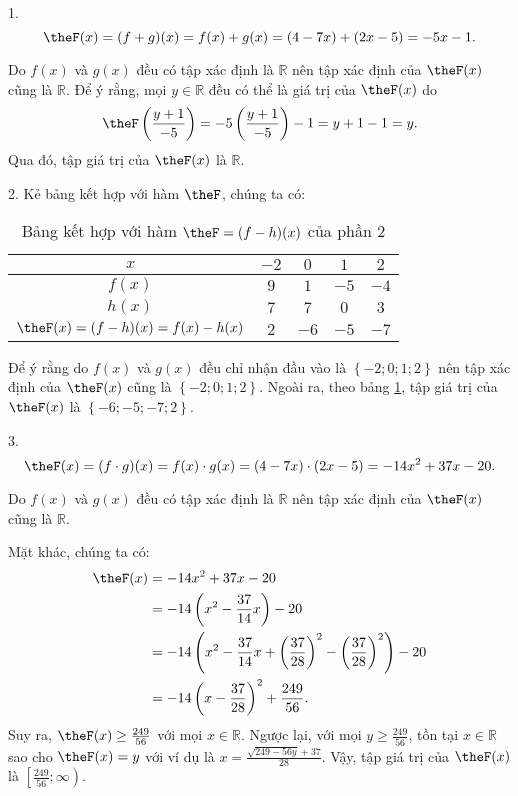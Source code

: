 \solution

1.
$$
\theF(x) = (f + g)(x) = f(x) + g(x) = (4 - 7x) + (2x - 5) = -5x - 1.
$$

Do $f(x)$ và $g(x)$ đều có tập xác định là $\mathbb{R}$ nên tập xác định của $\theF(x)$ cũng là $\mathbb{R}$. Để ý rằng, mọi $y \in \mathbb{R}$ đều có thể là giá trị của $\theF(x)$ do $$
   \theF\left(\frac{y + 1}{-5}\right) = -5\left(\frac{y + 1}{-5}\right) - 1 = y + 1 - 1 = y.
$$ Qua đó, tập giá trị của $\theF(x)$ là $\mathbb{R}$.

2. Kẻ bảng kết hợp với hàm $\theF$, chúng ta có:

\begin{table}[H]
   \centering
   \begin{tabular}{|c|c|c|c|c|}
      \hline
      $x$ & $-2$ & $0$ & $1$ & $2$ \\
      \hline
      $f(x)$ & $9$ & $1$ & $-5$ & $-4$ \\
      \hline
      $h(x)$ & $7$ & $7$ & $0$ & $3$ \\
      \hline
      $\theF(x) = (f - h)(x) = f(x) - h(x)$ & $2$ & $-6$ & $-5$ & $-7$ \\
      \hline
   \end{tabular}
   \caption{Bảng kết hợp với hàm $\theF= (f - h)(x)$ của phần 2}
   \label{tab:ham_so_mot_bien:phep_tinh_ham:theF_2}
\end{table}

Để ý rằng do $f(x)$ và $g(x)$ đều chỉ nhận đầu vào là $\left\{-2; 0; 1; 2\right\}$ nên tập xác định của $\theF(x)$ cũng là $\left\{-2; 0; 1; 2\right\}$. Ngoài ra, theo bảng \ref{tab:ham_so_mot_bien:phep_tinh_ham:theF_2}, tập giá trị của $\theF(x)$ là $\left\{-6; -5; -7; 2\right\}$.

3.
$$
\theF(x) = (f \cdot g)(x) = f(x) \cdot g(x) = (4 - 7x) \cdot (2x - 5) = -14x^2 + 37x - 20.
$$

Do $f(x)$ và $g(x)$ đều có tập xác định là $\mathbb{R}$ nên tập xác định của $\theF(x)$ cũng là $\mathbb{R}$.

Mặt khác, chúng ta có:
\begin{align*}
   \theF(x) &= -14x^2 + 37x - 20\\
   &= -14\left(x^2 - \frac{37}{14}x\right) - 20\\
   &= -14\left(x^2 - \frac{37}{14}x + \left(\frac{37}{28}\right)^2 - \left(\frac{37}{28}\right)^2\right) - 20\\
   &= -14\left(x - \frac{37}{28}\right)^2 + \frac{249}{56}.
\end{align*}
Suy ra, $\theF(x) \ge \frac{249}{56}$ với mọi $x \in \mathbb{R}$. Ngược lại, với mọi $y \ge \frac{249}{56}$, tồn tại $x \in \mathbb{R}$ sao cho $\theF(x) = y$ với ví dụ là $\displaystyle x=\frac{\sqrt{249-56y}+37}{28}$. Vậy, tập giá trị của $\theF(x)$ là $\left[\frac{249}{56}; \infty\right)$.


